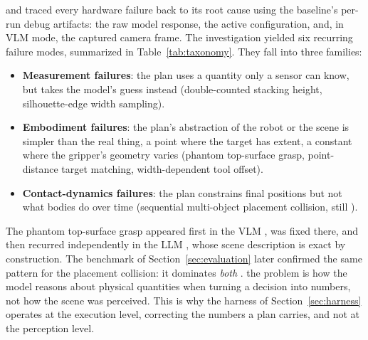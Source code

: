   and
traced every hardware failure back to its root cause using the
baseline's per-run debug artifacts: the raw model response, the active
configuration, and, in VLM mode, the captured camera frame.
The investigation yielded six recurring failure modes, summarized in
Table~\ref{tab:taxonomy}. They fall into three families:
\begin{itemize}
  \item \textbf{Measurement failures}: the plan uses a quantity
    only a sensor can know, but takes the model's guess instead
    (double-counted stacking height, silhouette-edge width sampling).
  \item \textbf{Embodiment failures}: the plan's abstraction of
    the robot or the scene is simpler than the real thing, a point
    where the target has extent, a constant where the gripper's
    geometry varies (phantom top-surface grasp, point-distance target
    matching, width-dependent tool offset).
  \item \textbf{Contact-dynamics failures}: the plan constrains
    final positions but not what bodies do over time (sequential
    multi-object placement collision, still ).
\end{itemize}

 The phantom
top-surface grasp appeared first in the VLM , was
fixed there, and then recurred independently in the LLM
, whose scene description is exact by
construction. The benchmark of Section~\ref{sec:evaluation} later
confirmed the same pattern for the placement collision: it dominates
\emph{both} .  the
problem is how the model reasons about physical quantities when
turning a decision into numbers, not how the scene was perceived. This
is why the harness of Section~\ref{sec:harness} operates at the
execution level, correcting the numbers a plan carries, and not at the
perception level.

